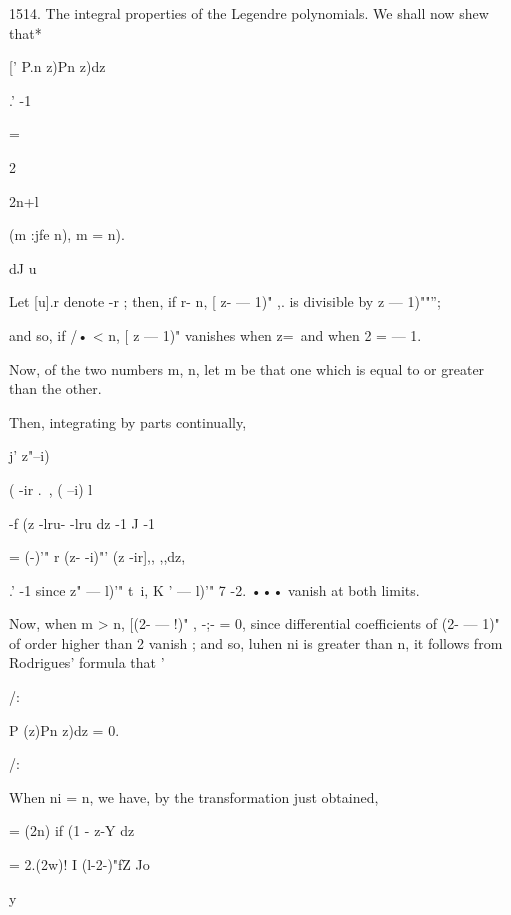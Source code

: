 {1514. The integral properties of the Legendre polynomials. 
We shall now shew that* 



[' P.n z)Pn z)dz  

.' -1 



= 



2 

2n+l 



(m :jfe n), 
 m = n). 



dJ u 



Let [u].r denote -r  ; then, if r- n, [ z- — 1)" ,. is divisible by  z  — 1)""''; 

and so, if /• < n, [ z  — 1)"   vanishes when z=\ and when 2 = — 1. 

Now, of the two numbers m, n, let m be that one which is equal to or 
greater than the other. 

Then, integrating by parts continually, 



j'     z"--i)%



 ( -ir  .\ ,  ( --i) l  



-f  (z  -lru-    -lru dz 
-1 J -1 



= (-)'" r (z- -i)"' (z -ir],, ,,dz, 

.' -1 
since   z"  — l)'"  t\ i, K ' — l)'" 7 -2. ••• vanish at both limits. 

Now, when m > n, [(2- — !)" , -;- = 0, since differential coefficients of (2- — 1)" 
of order higher than 2  vanish ; and so, luhen ni is greater than n, it follows 
from Rodrigues' formula that ' 



/: 



P (z)Pn z)dz = 0. 



/: 



When ni = n, we have, by the transformation just obtained, 

= (2n) if (1 - z-Y dz 

= 2.(2w)! I (l-2-)"fZ  
Jo 



y 



}
